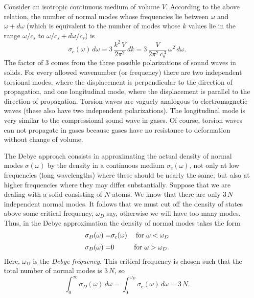 Consider an isotropic continuous medium of volume $V$. According to the above
 relation, the
number of normal modes whose frequencies lie between $\omega$ and $\omega+d \omega$
(which is equivalent to the number of modes whose $k$ values lie in the range $\omega/c_s$
to $\omega/c_s + d\omega/c_s$) is 
\begin{equation}
\sigma_c(\omega)\,d\omega = 3\, \frac{k^2\,V}{2\pi^2} \, dk = 3 \,\frac{V}
{2\pi^2 \,c_s^{~3}} \,\omega^2\,d\omega.\label{e7.152}
\end{equation}
The factor of $3$ comes from the three possible polarizations of sound waves in solids.
For every allowed wavenumber (or frequency) there are two independent torsional modes,
where the displacement is perpendicular to the direction of propagation, and one
longitudinal mode, where the displacement is parallel to the direction of propagation.
Torsion waves are vaguely analogous to electromagnetic waves (these also have two
independent polarizations). The longitudinal mode is very similar to the compressional
sound wave in gases. Of course, torsion waves can not propagate in gases because gases
have no resistance to deformation without change of volume. 

The Debye approach consists in approximating the actual density of normal modes
$\sigma(\omega)$ by the density in a continuous medium $\sigma_c(\omega)$, not
only at low frequencies (long wavelengths) where these should be nearly the same, but
also at higher frequencies where they  may differ substantially. Suppose that we are
dealing with a solid consisting of $N$ atoms.  We know that there are
only $3 \,N$ independent normal modes. It follows that we must cut off the
density of states above some critical frequency, $\omega_D$ say, otherwise we
will have too many modes.  Thus, in the Debye approximation the density
of normal modes takes the form
\begin{eqnarray}
\sigma_D(\omega)= &\sigma_c(\omega) &{\rm for~} \omega<\omega_D \nonumber\\[0.5ex]
\sigma_D(\omega) =&0&{\rm for~} \omega>\omega_D.\label{e7.153}
\end{eqnarray}
Here, $\omega_D$ is the {\em Debye frequency}. This critical frequency is chosen such that
the total number of normal modes is $3 \,N$, so
\begin{equation}
\int_0^\infty \sigma_D(\omega)\, d\omega = \int_0^{\omega_D }\sigma_c(\omega)\, d\omega = 
3\, N.
\end{equation}

